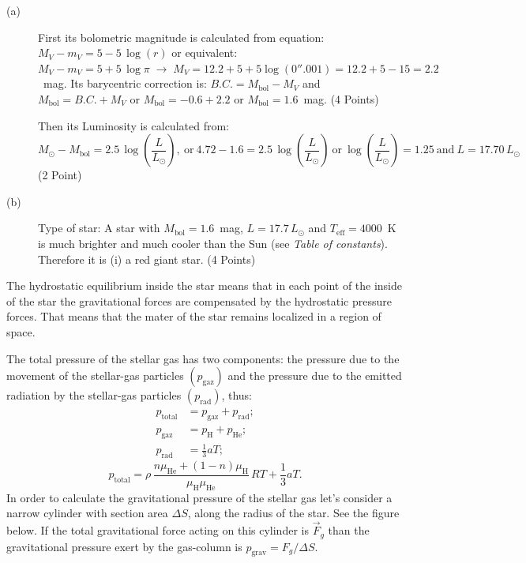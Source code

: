 \begin{description}
\item[(a)] First its bolometric magnitude is calculated from equation:
  $M_V - m_V = 5 - 5\,\log(r)$ or equivalent:
  $M_V - m_V = 5 + 5\,\log\pi \;\rightarrow\;
  M_V = 12.2 + 5 + 5\log(0''.001) = 12.2 + 5 - 15 = 2.2$~mag.
  Its barycentric correction is: %
  $B.C. = M_{\mathrm{bol}} - M_V$ and $M_{\mathrm{bol}} = B.C. + M_V$ or
  $M_{\mathrm{bol}} = -0.6 + 2.2$ or $M_{\mathrm{bol}} = 1.6$~mag.
  \hfill(4 Points)

  Then its Luminosity is calculated from:
  \[
    M_\odot - M_{\mathrm{bol}} = 2.5\,\log\!\left(\frac{L}{L_\odot}\right),
    \ \text{or}\
    4.72 - 1.6 = 2.5\,\log\!\left(\frac{L}{L_\odot}\right)
    \ \text{or}\
    \log\!\left(\frac{L}{L_\odot}\right) = 1.25
    \ \text{and}\ L = 17.70\,L_\odot
  \]
  \hfill(2 Point)
\item[(b)] Type of star: A star with $M_{\mathrm{bol}} = 1.6$~mag,
  $L = 17.7\,L_\odot$ and $T_{\mathrm{eff}} = 4000$~K is much brighter and much
  cooler than the Sun (see \emph{Table of constants}). Therefore it is (i) a red
  giant star.
  \hfill(4 Points)
\end{description}

The hydrostatic equilibrium inside the star means that in each point of the
inside of the star the gravitational forces are compensated by the hydrostatic
pressure forces. That means that the mater of the star remains localized in a
region of space.

The total pressure of the stellar gas has two components: the pressure due to
the movement of the stellar-gas particles $\left(p_{\mathrm{gaz}}\right)$ and
the pressure due to the emitted radiation by the stellar-gas particles
$\left(p_{\mathrm{rad}}\right)$, thus:
\begin{align*}
  p_{\mathrm{total}} &= p_{\mathrm{gaz}} + p_{\mathrm{rad}}; \\
  p_{\mathrm{gaz}} &= p_{\mathrm{H}} + p_{\mathrm{He}}; \\
  p_{\mathrm{rad}} &= \frac{1}{3}aT; %
\end{align*}
\[
  p_{\mathrm{total}}
  = \rho\,\frac{n\mu_{\mathrm{He}} + (1-n)\mu_{\mathrm{H}}}{\mu_{\mathrm{H}}\mu_{\mathrm{He}}}\,RT
    + \frac{1}{3}aT. \tag{1}
\]
In order to calculate the gravitational pressure of the stellar gas let's
consider a narrow cylinder with section area $\Delta S$, along the radius of
the star. See the figure below. If the total gravitational force acting on this
cylinder is $\vec{F}_g$ than the gravitational pressure exert by the
gas-column is $p_{\mathrm{grav}} = F_g/\Delta S$.
\ioaafig{2014_TH_P10-s1.pdf}

